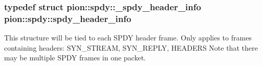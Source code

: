 \hypertarget{namespacepion_1_1spdy_a74229af785f47c8b3f3d29822086603a}{
\subsubsection[{spdy\-\_\-header\-\_\-info}]{\setlength{\rightskip}{0pt plus 5cm}typedef struct {\bf pion\-::spdy\-::\-\_\-spdy\-\_\-header\-\_\-info}  {\bf pion\-::spdy\-::spdy\-\_\-header\-\_\-info}}}\label{namespacepion_1_1spdy_a74229af785f47c8b3f3d29822086603a}
This structure will be tied to each S\-P\-D\-Y header frame. Only applies to frames containing headers\-: S\-Y\-N\-\_\-\-S\-T\-R\-E\-A\-M, S\-Y\-N\-\_\-\-R\-E\-P\-L\-Y, H\-E\-A\-D\-E\-R\-S Note that there may be multiple S\-P\-D\-Y frames in one packet. 

